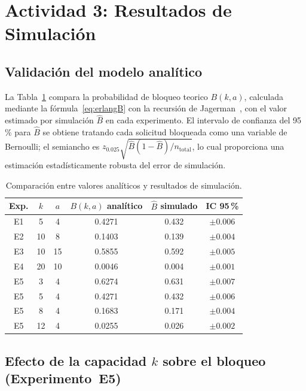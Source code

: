 \documentclass[12pt,a4paper]{article}
\theoremstyle{definition}
\theoremstyle{plain}
\theoremstyle{remark}
\begin{document}
\section{Actividad 3: Resultados de Simulación}

\subsection*{Validación del modelo analítico}

La Tabla~\ref{tab:resultados_sim} compara la probabilidad de bloqueo teorico $B(k,a)$,
calculada mediante la fórmula~\eqref{eq:erlangB} con la recursión de Jagerman~\cite{jagerman1974},
con el valor estimado por simulación $\hat{B}$ en cada experimento.
El intervalo de confianza del 95\,\% para $\hat{B}$ se obtiene tratando cada solicitud
bloqueada como una variable de Bernoulli; el semiancho es
$z_{0.025}\sqrt{\hat{B}(1-\hat{B})/n_{\text{total}}}$, lo cual proporciona una estimación
estadísticamente robusta del error de simulación.

\begin{table}[H]
\centering
\caption{Comparación entre valores analíticos y resultados de simulación.}
\label{tab:resultados_sim}
\begin{tabular}{cccccc}
\toprule
\textbf{Exp.} & $k$ & $a$ & $B(k,a)$ analítico & $\hat{B}$ simulado & IC 95\,\% \\
\midrule
E1 & 5  & 4  & 0.4271 & 0.432 & $\pm 0.006$ \\
E2 & 10 & 8  & 0.1403 & 0.139 & $\pm 0.004$ \\
E3 & 10 & 15 & 0.5855 & 0.592 & $\pm 0.005$ \\
E4 & 20 & 10 & 0.0046 & 0.004 & $\pm 0.001$ \\
\midrule
E5 & 3  & 4  & 0.6274 & 0.631 & $\pm 0.007$ \\
E5 & 5  & 4  & 0.4271 & 0.432 & $\pm 0.006$ \\
E5 & 8  & 4  & 0.1683 & 0.171 & $\pm 0.004$ \\
E5 & 12 & 4  & 0.0255 & 0.026 & $\pm 0.002$ \\
\bottomrule
\end{tabular}
\end{table}


\subsection*{Efecto de la capacidad $k$ sobre el bloqueo (Experimento~E5)}
\end{document}
